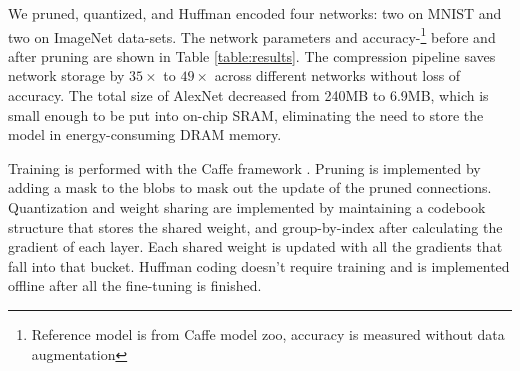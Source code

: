 \documentclass{article} %
\begin{document}
We pruned, quantized, and Huffman encoded four networks: two on MNIST and two on ImageNet data-sets.
The network parameters and accuracy-\footnote{Reference model is from Caffe model zoo, accuracy is measured without data augmentation} before and after pruning are shown in Table \ref{table:results}. The compression pipeline saves network storage by $35\times$ to $49\times$ across different networks without loss of accuracy. The total size of AlexNet decreased from 240MB to 6.9MB, which is small enough to be put into on-chip SRAM, eliminating the need to store the model in energy-consuming DRAM memory. 

Training is performed with the Caffe framework \citep{jia2014caffe}. Pruning is implemented by adding a mask to the blobs to mask out the update of the pruned connections. Quantization and weight sharing are implemented by maintaining a codebook structure that stores the shared weight,  and group-by-index after calculating the gradient of each layer. Each shared weight is updated with all the gradients that fall into that bucket. Huffman coding doesn't require training and is implemented offline after all the fine-tuning is finished.
\end{document}

